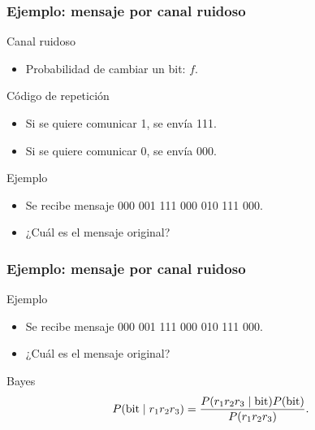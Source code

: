 \documentclass[table]{beamer}
\begin{document}
\begin{frame}
    \frametitle{Ejemplo: mensaje por canal ruidoso}
    \begin{block}{Canal ruidoso}
        \begin{itemize}
            \item Probabilidad de cambiar un bit: $f$.
        \end{itemize}
    \end{block}
    \begin{block}{Código de repetición}
        \begin{itemize}
            \item Si se quiere comunicar 1, se envía 111.
            \item Si se quiere comunicar 0, se envía 000.
        \end{itemize}
    \end{block}
    \begin{block}{Ejemplo}
        \begin{itemize}
            \item Se recibe mensaje 000 001 111 000 010 111 000.
            \item ¿Cuál es el mensaje original?
        \end{itemize}
    \end{block}
\end{frame}

\begin{frame}
    \frametitle{Ejemplo: mensaje por canal ruidoso}
    \begin{block}{Ejemplo}
        \begin{itemize}
            \item Se recibe mensaje 000 001 111 000 010 111 000.
            \item ¿Cuál es el mensaje original?
        \end{itemize}
    \end{block}
    \begin{block}{Bayes}
        \begin{equation*}
            \prob{\text{bit} \mid r_{1} r_{2} r_{3}} = \frac{\prob{r_{1} r_{2} r_{3} \mid \text{bit}} \prob{\text{bit}}}{\prob{r_{1} r_{2} r_{3}}} .
        \end{equation*}
    \end{block}
\end{frame}
\end{document}
